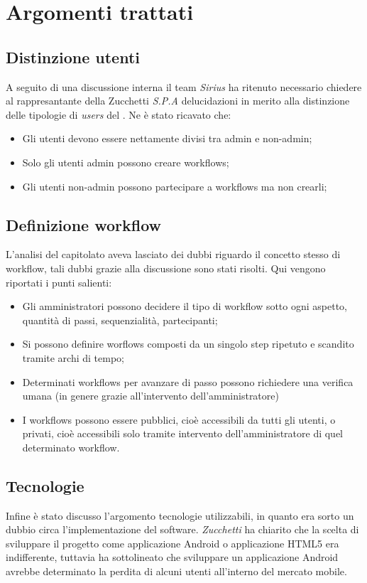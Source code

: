 \section{Argomenti trattati}
\subsection{Distinzione utenti}
A seguito di una discussione interna il team \emph{Sirius }ha ritenuto necessario chiedere al rappresantante della Zucchetti \textit{S.P.A} delucidazioni in merito alla distinzione delle tipologie di \emph{users }del \progetto.
Ne è stato ricavato che:
\begin{itemize}
\item Gli utenti devono essere nettamente divisi tra admin e non-admin;
\item Solo gli utenti admin possono creare workflows;
\item Gli utenti non-admin possono partecipare a workflows ma non crearli;
\end{itemize}

\subsection{Definizione workflow}
L'analisi del capitolato aveva lasciato dei dubbi riguardo il concetto stesso di workflow, tali dubbi grazie alla discussione sono stati risolti.
Qui vengono riportati i punti salienti:

\begin{itemize}
\item Gli amministratori possono decidere il tipo di workflow sotto ogni aspetto, quantità di passi, sequenzialità, partecipanti;
\item Si possono definire worflows composti da un singolo step ripetuto e scandito tramite archi di tempo;
\item Determinati workflows per avanzare di passo possono richiedere una verifica umana (in genere grazie all'intervento dell'amministratore)
\item I workflows possono essere pubblici, cioè accessibili da tutti gli utenti, o privati, cioè accessibili solo tramite intervento dell'amministratore di quel determinato workflow.
\end{itemize}

\subsection{Tecnologie}
Infine è stato discusso l'argomento tecnologie utilizzabili, in quanto era sorto un dubbio circa l'implementazione del software.
\textit{Zucchetti} ha chiarito che la scelta di sviluppare il progetto come applicazione Android o applicazione HTML5 era indifferente, tuttavia ha sottolineato che sviluppare un applicazione Android avrebbe determinato la perdita di alcuni utenti all'interno del mercato mobile.

